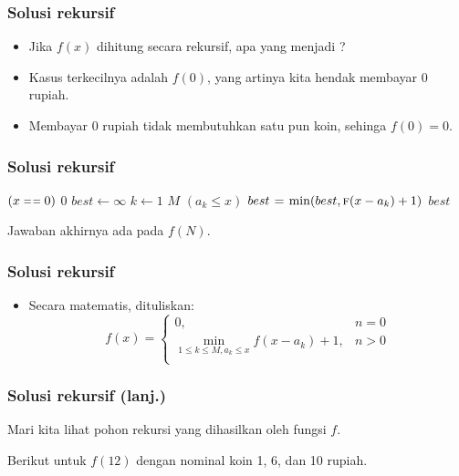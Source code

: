 \begin{frame}
\frametitle{Solusi rekursif}
\begin{itemize}
  \item Jika $f(x)$ dihitung secara rekursif, apa yang menjadi \fbasecase?
  \item Kasus terkecilnya adalah $f(0)$, yang artinya kita hendak membayar 0 rupiah.
  \item Membayar 0 rupiah tidak membutuhkan satu pun koin, sehinga $f(0) = 0$.
\end{itemize}
\end{frame}

\begin{frame}
\frametitle{Solusi rekursif}
\begin{codebox}
\li \If $(x \isequal 0)$ \Then
\li   \Return $0$
\li \Else
\li   $best \gets \infty$
\li   \For $k \gets 1$ \To $M$ \Do
\li     \If $(a_k \leq x)$ \Then
\li       $best \mathrel{\hspace{1pt}=\hspace{1pt}} \min(best, \textnormal{\scshape f}(x - a_k) + 1)$
        \End
      \End
\li   \Return $best$
    \End
\end{codebox}

Jawaban akhirnya ada pada $f(N)$.
\end{frame}

\begin{frame}
\frametitle{Solusi rekursif}
\begin{itemize}
  \item Secara matematis, dituliskan:
   \[f(x) = \left\{\begin{array}{lr}
        0, & n = 0\\
        \min_{1 \leq k \leq M, a_k \leq x} {f(x - a_k) + 1}, & n > 0\\
        \end{array}\right. \]
 \end{itemize}
\end{frame}

\begin{frame} [fragile]
\frametitle{Solusi rekursif (lanj.)}
Mari kita lihat pohon rekursi yang dihasilkan oleh fungsi $f$. 

Berikut untuk $f(12)$ dengan nominal koin 1, 6, dan 10 rupiah.

\begin{center}
\scalebox{0.9}{
\Tree [.$f(12)$
  [.$f(2)$
    [.$f(1)$
      [.$f(0)$ ]
    ]
  ]
  [.$f(6)$
    [.$f(0)$ ]
    [.$f(5)$
      [.$f(4)$
        [.$...$
        ]
      ]
    ]
  ]
  [.$f(11)$
    [.$f(1)$
      [.$f(0)$ ]
    ]
    [.$f(5)$
      [.$f(4)$
        [.$...$          
        ]
      ]
    ]
    [.$f(10)$ 
      [.$f(0)$ 
        [.$...$ ]      
      ]
      [.$f(4)$ 
        [.$...$ ]      
      ]
      [.$f(9)$ 
        [.$...$ ]      
      ]
    ]
  ]
]
}
\end{center}
\end{frame}

